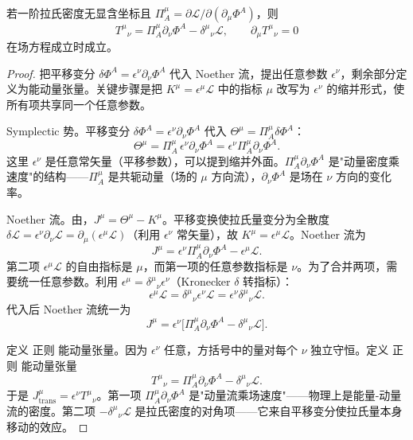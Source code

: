 \begin{proposition}
若一阶拉氏密度无显含坐标且 $\Pi_A^\mu=\partial\mathcal L/\partial(\partial_\mu\Phi^A)$，则\[T^\mu{}_\nu=\Pi_A^\mu\partial_\nu\Phi^A-\delta^\mu{}_\nu\mathcal L,\qquad\partial_\mu T^\mu{}_\nu=0\]在场方程成立时成立。
\end{proposition}

\begin{proof}
把平移变分 $\delta\Phi^A=\epsilon^\nu\partial_\nu\Phi^A$ 代入 Noether 流，提出任意参数 $\epsilon^\nu$，剩余部分定义为能动量张量。关键步骤是把 $K^\mu=\epsilon^\mu\mathcal{L}$ 中的指标 $\mu$ 改写为 $\epsilon^\nu$ 的缩并形式，使所有项共享同一个任意参数。

Symplectic 势。平移变分 $\delta\Phi^A=\epsilon^\nu\partial_\nu\Phi^A$ 代入 $\Theta^\mu=\Pi_A^\mu\delta\Phi^A$：
\begin{equation*}
\Theta^\mu=\Pi_A^\mu\,\epsilon^\nu\partial_\nu\Phi^A=\epsilon^\nu\Pi_A^\mu\partial_\nu\Phi^A.
\end{equation*}
这里 $\epsilon^\nu$ 是任意常矢量（平移参数），可以提到缩并外面。$\Pi_A^\mu\partial_\nu\Phi^A$ 是"动量密度乘速度"的结构——$\Pi_A^\mu$ 是共轭动量（场的 $\mu$ 方向流），$\partial_\nu\Phi^A$ 是场在 $\nu$ 方向的变化率。

Noether 流。由，$J^\mu=\Theta^\mu-K^\mu$。平移变换使拉氏量变分为全散度 $\delta\mathcal{L}=\epsilon^\nu\partial_\nu\mathcal{L}=\partial_\mu(\epsilon^\mu\mathcal{L})$（利用 $\epsilon^\nu$ 常矢量），故 $K^\mu=\epsilon^\mu\mathcal{L}$。Noether 流为
\begin{equation*}
J^\mu=\epsilon^\nu\Pi_A^\mu\partial_\nu\Phi^A-\epsilon^\mu\mathcal{L}.
\end{equation*}
第二项 $\epsilon^\mu\mathcal{L}$ 的自由指标是 $\mu$，而第一项的任意参数指标是 $\nu$。为了合并两项，需要统一任意参数。利用 $\epsilon^\mu=\delta^\mu{}_\nu\epsilon^\nu$（Kronecker $\delta$ 转指标）：
\begin{equation*}
\epsilon^\mu\mathcal{L}=\delta^\mu{}_\nu\epsilon^\nu\mathcal{L}=\epsilon^\nu\delta^\mu{}_\nu\mathcal{L}.
\end{equation*}
代入后 Noether 流统一为
\begin{equation*}
J^\mu=\epsilon^\nu\big[\Pi_A^\mu\partial_\nu\Phi^A-\delta^\mu{}_\nu\mathcal{L}\big].
\end{equation*}

定义 正则 能动量张量。因为 $\epsilon^\nu$ 任意，方括号中的量对每个 $\nu$ 独立守恒。定义 正则 能动量张量
\begin{equation}\label{eq:ms-poincare-T-can}
\boxed{
T^\mu{}_\nu=\Pi_A^\mu\partial_\nu\Phi^A-\delta^\mu{}_\nu\mathcal{L}.
}
\end{equation}
于是 $J^\mu_{\text{trans}}=\epsilon^\nu T^\mu{}_\nu$。第一项 $\Pi_A^\mu\partial_\nu\Phi^A$ 是"动量流乘场速度"——物理上是能量-动量流的密度。第二项 $-\delta^\mu{}_\nu\mathcal{L}$ 是拉氏密度的对角项——它来自平移变分使拉氏量本身移动的效应。


\end{proof}
